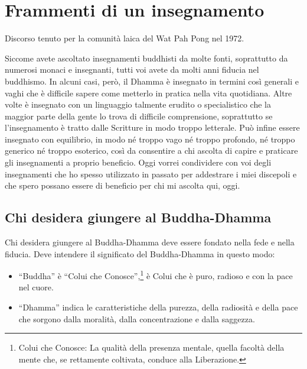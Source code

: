 \chapter{Frammenti di un insegnamento}

\begin{openingQuote}
  \centering

  Discorso tenuto per la comunità laica del Wat Pah Pong nel 1972.
\end{openingQuote}

Siccome avete ascoltato insegnamenti buddhisti da molte fonti,
soprattutto da numerosi monaci e insegnanti, tutti voi avete da molti
anni fiducia nel buddhismo. In alcuni casi, però, il Dhamma è insegnato
in termini così generali e vaghi che è difficile sapere come metterlo in
pratica nella vita quotidiana. Altre volte è insegnato con un linguaggio
talmente erudito o specialistico che la maggior parte della gente lo
trova di difficile comprensione, soprattutto se l'insegnamento è tratto
dalle Scritture in modo troppo letterale. Può infine essere insegnato
con equilibrio, in modo né troppo vago né troppo profondo, né troppo
generico né troppo esoterico, così da consentire a chi ascolta di capire
e praticare gli insegnamenti a proprio beneficio. Oggi vorrei
condividere con voi degli insegnamenti che ho spesso utilizzato in
passato per addestrare i miei discepoli e che spero possano essere di
beneficio per chi mi ascolta qui, oggi.

\section{Chi desidera giungere al Buddha-Dhamma}

Chi desidera giungere al Buddha-Dhamma deve essere fondato nella fede e
nella fiducia. Deve intendere il significato del Buddha-Dhamma in questo
modo:

\begin{itemize}

\item ``Buddha'' è ``Colui che Conosce'',\footnote{Colui che Conosce: La qualità
    della presenza mentale, quella facoltà della mente che, se rettamente
    coltivata, conduce alla Liberazione.} è Colui che è puro, radioso e con la
  pace nel cuore.

\item ``Dhamma'' indica le caratteristiche della purezza, della radiosità e
  della pace che sorgono dalla moralità, dalla concentrazione e dalla saggezza.

\end{itemize}

